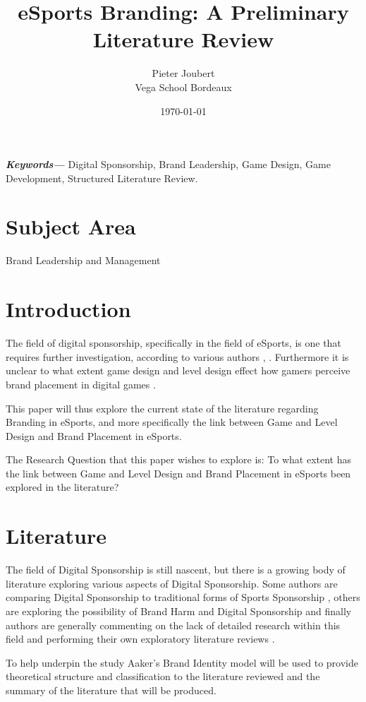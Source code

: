 \documentclass[10pt,twoside]{article}
\title{eSports Branding: A Preliminary Literature Review}
\author{Pieter Joubert \\
	Vega School Bordeaux \\
	}
\date{\today}
\providecommand{\keywords}[1]
{
  \small	
  \textbf{\textit{Keywords---}} #1
}
\begin{document}
\maketitle
\keywords{Digital Sponsorship, Brand Leadership, Game Design, Game Development, Structured Literature Review.}

\section{Subject Area}
Brand Leadership and Management
\section{Introduction}

The field of digital sponsorship, specifically in the field of eSports, is one that requires further investigation, according to various authors \cite{huettermann2020esports}, \cite{Elasri-Ejjaberi2020}. Furthermore it is unclear to what extent game design and level design effect how gamers perceive brand placement in digital games \cite{hwang2017effects}.

This paper will thus explore the current state of the literature regarding Branding in eSports, and more specifically the link between Game and Level Design and Brand Placement in eSports.

The Research Question that this paper wishes to explore is: To what extent has the link between Game and Level Design and Brand Placement in eSports been explored in the literature?

\section{Literature}
The field of Digital Sponsorship is still nascent, but there is a growing body of literature exploring various aspects of Digital Sponsorship. Some authors are comparing Digital Sponsorship to traditional forms of Sports Sponsorship \cite{huettermann2020esports}, others are exploring the possibility of Brand Harm and Digital Sponsorship \cite{Freitas2019} and finally authors are generally commenting on the lack of detailed research within this field and performing their own exploratory literature reviews \cite{Elasri-Ejjaberi2020}.

To help underpin the study Aaker's Brand Identity model will be used to provide theoretical structure and classification to the literature reviewed and the summary of the literature that will be produced. \cite{aaker2012brand}
\end{document}
